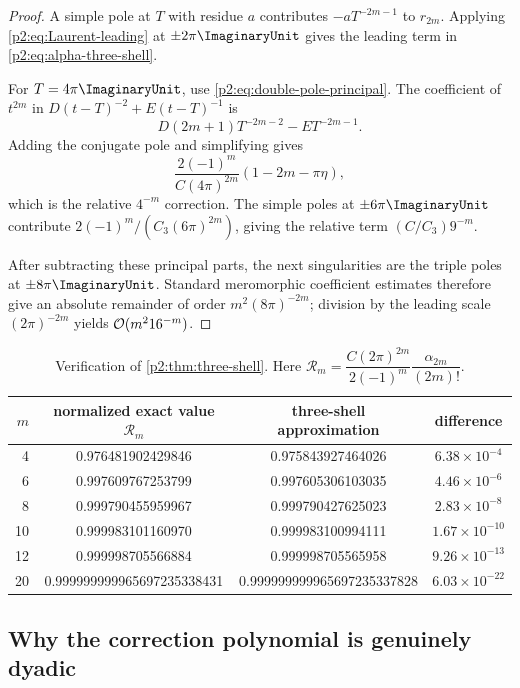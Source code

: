 \documentclass[11pt,oneside]{article}
\numberwithin{equation}{section}
\theoremstyle{definition}
\theoremstyle{remark}
\begin{document}
\begin{proof}
A simple pole at $T$ with residue $a$ contributes $-aT^{-2m-1}$ to $r_{2m}$.  Applying
\eqref{p2:eq:Laurent-leading} at $\pm2\pi\ImaginaryUnit$ gives the leading term in
\eqref{p2:eq:alpha-three-shell}.

For $T=4\pi\ImaginaryUnit$, use \eqref{p2:eq:double-pole-principal}.  The coefficient of $t^{2m}$ in
$D(t-T)^{-2}+E(t-T)^{-1}$ is
\[
 D(2m+1)T^{-2m-2}-ET^{-2m-1}.
\]
Adding the conjugate pole and simplifying gives
\[
 \frac{2(-1)^m}{C(4\pi)^{2m}}(1-2m-\pi\eta),
\]
which is the relative $4^{-m}$ correction.  The simple poles at $\pm6\pi\ImaginaryUnit$ contribute
$2(-1)^m/(C_3(6\pi)^{2m})$, giving the relative term $(C/C_3)9^{-m}$.

After subtracting these principal parts, the next singularities are the triple poles at
$\pm8\pi\ImaginaryUnit$.  Standard meromorphic coefficient estimates therefore give an absolute remainder
of order $m^2(8\pi)^{-2m}$; division by the leading scale $(2\pi)^{-2m}$ yields
$\mathcal O(m^2 16^{-m})$.
\end{proof}

\begin{table}[htbp]
\centering
\small
\begin{tabular}{@{}rccc@{}}
\toprule
$m$ & normalized exact value $\mathcal R_m$ & three-shell approximation & difference \\
\midrule
4  & 0.976481902429846 & 0.975843927464026 & $6.38\times10^{-4}$ \\
6  & 0.997609767253799 & 0.997605306103035 & $4.46\times10^{-6}$ \\
8  & 0.999790455959967 & 0.999790427625023 & $2.83\times10^{-8}$ \\
10 & 0.999983101160970 & 0.999983100994111 & $1.67\times10^{-10}$ \\
12 & 0.999998705566884 & 0.999998705565958 & $9.26\times10^{-13}$ \\
20 & 0.999999999965697235338431 & 0.999999999965697235337828 & $6.03\times10^{-22}$ \\
\bottomrule
\end{tabular}
\caption{Verification of \cref{p2:thm:three-shell}.  Here
$\mathcal R_m=\dfrac{C(2\pi)^{2m}}{2(-1)^m}\dfrac{\alpha_{2m}}{(2m)!}$.}
\label{p2:tab:three-shell}
\end{table}

\subsection{Why the correction polynomial is genuinely dyadic}
\end{document}

